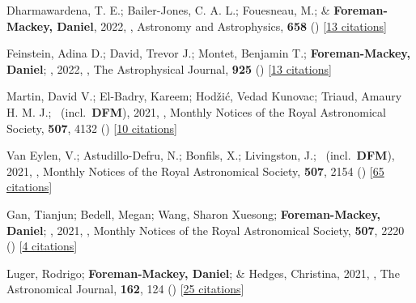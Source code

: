\item[{\color{numcolor}\scriptsize76}] Dharmawardena, T. E.; Bailer-Jones, C. A. L.; Fouesneau, M.; \& \textbf{Foreman-Mackey, Daniel}, 2022, , Astronomy and Astrophysics, \textbf{658} () [\href{https://ui.adsabs.harvard.edu/abs/2022A&A...658A.166D}{13 citations}]

\item[{\color{numcolor}\scriptsize75}] Feinstein, Adina D.; David, Trevor J.; Montet, Benjamin T.; \textbf{Foreman-Mackey, Daniel}; \etal, 2022, , The Astrophysical Journal, \textbf{925} () [\href{https://ui.adsabs.harvard.edu/abs/2022ApJ...925L...2F}{13 citations}]

\item[{\color{numcolor}\scriptsize74}] Martin, David V.; El-Badry, Kareem; Hod{\v{z}}i{\'c}, Vedad Kunovac; Triaud, Amaury H. M. J.; \etal\ (incl.\ \textbf{DFM}), 2021, , Monthly Notices of the Royal Astronomical Society, \textbf{507}, 4132 () [\href{https://ui.adsabs.harvard.edu/abs/2021MNRAS.507.4132M}{10 citations}]

\item[{\color{numcolor}\scriptsize73}] Van Eylen, V.; Astudillo-Defru, N.; Bonfils, X.; Livingston, J.; \etal\ (incl.\ \textbf{DFM}), 2021, , Monthly Notices of the Royal Astronomical Society, \textbf{507}, 2154 () [\href{https://ui.adsabs.harvard.edu/abs/2021MNRAS.507.2154V}{65 citations}]

\item[{\color{numcolor}\scriptsize72}] Gan, Tianjun; Bedell, Megan; Wang, Sharon Xuesong; \textbf{Foreman-Mackey, Daniel}; \etal, 2021, , Monthly Notices of the Royal Astronomical Society, \textbf{507}, 2220 () [\href{https://ui.adsabs.harvard.edu/abs/2021MNRAS.507.2220G}{4 citations}]

\item[{\color{numcolor}\scriptsize71}] Luger, Rodrigo; \textbf{Foreman-Mackey, Daniel}; \& Hedges, Christina, 2021, , The Astronomical Journal, \textbf{162}, 124 () [\href{https://ui.adsabs.harvard.edu/abs/2021AJ....162..124L}{25 citations}]

